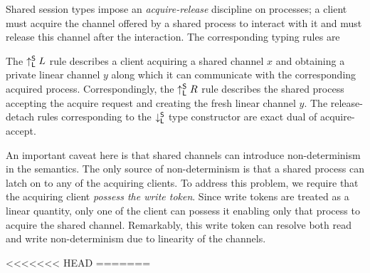 Shared session types impose an \emph{acquire-release} discipline on processes; 
a client must acquire the channel offered by a shared process to interact with it
and must release this channel after the interaction.
The corresponding typing rules are
The $\uparrow^{\mathsf{S}}_{\mathsf{L}} L$ rule describes a client acquiring a shared channel $x$
and obtaining a private linear channel $y$ along which it can communicate
with the corresponding acquired process.
Correspondingly, the $\uparrow^{\mathsf{S}}_{\mathsf{L}} R$ rule describes the shared process
accepting the acquire request and creating the fresh linear channel $y$.
The release-detach rules corresponding to the $\downarrow^{\mathsf{S}}_{\mathsf{L}}$ type constructor
are exact dual of acquire-accept.

An important caveat here is that shared channels can introduce non-determinism
in the semantics.
The only source of non-determinism is that a shared process can latch on to
any of the acquiring clients.
To address this problem, we require that the acquiring client \emph{possess
the write token}.
Since write tokens are treated as a linear quantity, only one of the client can
possess it enabling only that process to acquire the shared channel.
Remarkably, this write token can resolve both read and write non-determinism
due to linearity of the channels.

<<<<<<< HEAD
=======
